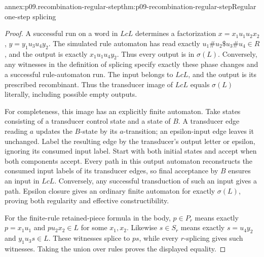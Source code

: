 \begin{annexitem}{annex:p09.recombination-regular-step}{thm:p09-recombination-regular-step}{Regular one-step splicing}
\begin{proof}
A successful run on a word in \(LcL\) determines a factorization
\(x=x_1u_1u_2x_2\), \(y=y_1u_3u_4y_2\).
The simulated rule automaton has read exactly
\(u_1\#u_2\$u_3\#u_4\in R\), and the output is exactly
\(x_1u_1u_4y_2\). Thus every output is in \(\sigma(L)\).
Conversely, any witnesses in the definition of splicing specify exactly
these phase changes and a successful rule-automaton run. The input belongs
to \(LcL\), and the output is its prescribed recombinant.
Thus the transducer image of \(LcL\) equals \(\sigma(L)\) literally,
including possible empty outputs.

For completeness, this image has an explicitly finite automaton.
Take states consisting of a transducer control state and a state of \(B\).
A transducer edge reading \(a\) updates the \(B\)-state by its \(a\)-transition;
an epsilon-input edge leaves it unchanged. Label the resulting edge by
the transducer's output letter or epsilon, ignoring its consumed input label.
Start with both initial states and accept when both components accept.
Every path in this output automaton reconstructs the consumed input labels
of its transducer edges, so final acceptance by \(B\) ensures an input in
\(LcL\). Conversely, any successful transduction of such an input gives
a path. Epsilon closure gives an ordinary finite automaton for exactly
\(\sigma(L)\), proving both regularity and effective constructibility.

For the finite-rule retained-piece formula in the body, \(p\in P_r\)
means exactly \(p=x_1u_1\) and \(pu_2x_2\in L\) for some \(x_1,x_2\).
Likewise \(s\in S_r\) means exactly \(s=u_4y_2\) and \(y_1u_3s\in L\).
These witnesses splice to \(ps\), while every \(r\)-splicing gives such
witnesses. Taking the union over rules proves the displayed equality.
\end{proof}
\end{annexitem}

